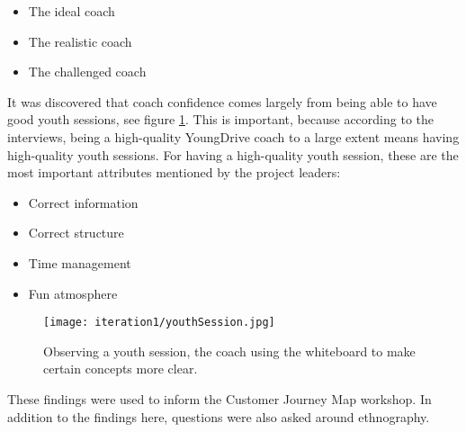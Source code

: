 \begin{itemize}
  \item The ideal coach
  \item The realistic coach
  \item The challenged coach
\end{itemize}

It was discovered that coach confidence comes largely from being able to have good youth sessions, see figure \ref{fig:youthSession1}. This is important, because according to the interviews, being a high-quality YoungDrive coach to a large extent means having high-quality youth sessions. For having a high-quality youth session, these are the most important attributes mentioned by the project leaders:

\begin{itemize}
  \item Correct information
  \item Correct structure
  \item Time management
  \item Fun atmosphere
\end{itemize}

\begin{figure}[h]
  \centering
  \texttt{[image: iteration1/youthSession.jpg]}
  \caption{Observing a youth session, the coach using the whiteboard to make certain concepts more clear.}
  \label{fig:youthSession1}
\end{figure}

These findings were used to inform the Customer Journey Map workshop. In addition to the findings here, questions were also asked around ethnography.

